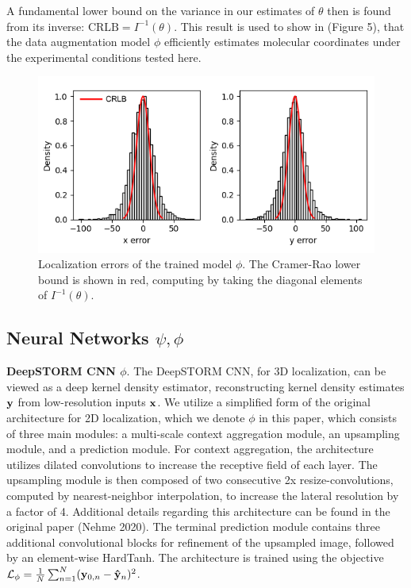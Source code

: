 \documentclass{article}
\begin{document}
A fundamental lower bound on the variance in our estimates of $\theta$ then is found from its inverse: $\mathrm{CRLB} = I^{-1}(\theta)$. This result is used to show in (Figure 5), that the data augmentation model $\phi$ efficiently estimates molecular coordinates under the experimental conditions tested here. 

\begin{figure}
\centering
\includegraphics[scale=0.7]{Errors.png}
\caption{Localization errors of the trained model $\phi$. The Cramer-Rao lower bound is shown in red, computing by taking the diagonal elements of $I^{-1}(\theta)$.}
\end{figure}


\subsection{Neural Networks $\psi,\phi$}

\textbf{DeepSTORM CNN $\phi$}. The DeepSTORM CNN, for 3D localization, can be viewed as a deep kernel density estimator, reconstructing kernel density estimates $\bold{y}$ from low-resolution inputs $\bold{x}$. We utilize a simplified form of the original architecture for 2D localization, which we denote $\phi$ in this paper, which consists of three main modules: a multi-scale context aggregation module, an upsampling module, and a prediction module. For context aggregation, the architecture utilizes dilated convolutions to increase the receptive field of each layer. The upsampling module is then composed of two consecutive 2x resize-convolutions, computed by nearest-neighbor interpolation, to increase the lateral resolution by a factor of 4. Additional details regarding this architecture can be found in the original paper (Nehme 2020). The terminal prediction module contains three additional convolutional blocks for refinement of the upsampled image, followed by an element-wise HardTanh. The architecture is trained using the objective $\mathcal{L}_{\phi} = \frac{1}{N}\sum_{n=1}^{N} (\bold{y}_{0,n}-\bold{\hat{y}}_{n})^{2}$. 
\end{document}

